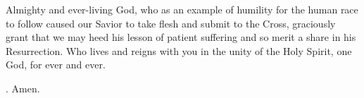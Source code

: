 \lettrine[lines=3]{A}{}lmighty and ever-living God,
who as an example of humility for the human race to follow
caused our Savior to take flesh and submit to the Cross,
graciously grant that we may heed his lesson of patient suffering
and so merit a share in his Resurrection.
Who lives and reigns with you in the unity of the Holy Spirit,
one God, for ever and ever. \par \Rbar. Amen.